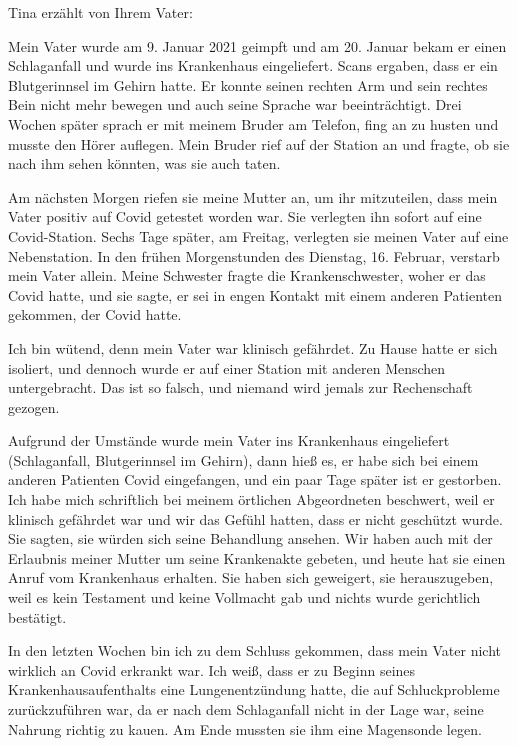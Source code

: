 Tina erzählt von Ihrem Vater:

Mein Vater wurde am 9. Januar 2021 geimpft und am 20. Januar bekam er einen
Schlaganfall und wurde ins Krankenhaus eingeliefert. Scans ergaben, dass er ein
Blutgerinnsel im Gehirn hatte. Er konnte seinen rechten Arm und sein rechtes
Bein nicht mehr bewegen und auch seine Sprache war beeinträchtigt. Drei Wochen
später sprach er mit meinem Bruder am Telefon, fing an zu husten und musste den
Hörer auflegen. Mein Bruder rief auf der Station an und fragte, ob sie nach ihm
sehen könnten, was sie auch taten.

Am nächsten Morgen riefen sie meine Mutter an, um ihr mitzuteilen, dass mein
Vater positiv auf Covid getestet worden war. Sie verlegten ihn sofort auf eine
Covid-Station. Sechs Tage später, am Freitag, verlegten sie meinen Vater auf
eine Nebenstation. In den frühen Morgenstunden des Dienstag, 16. Februar,
verstarb mein Vater allein. Meine Schwester fragte die Krankenschwester, woher
er das Covid hatte, und sie sagte, er sei in engen Kontakt mit einem anderen
Patienten gekommen, der Covid hatte.

Ich bin wütend, denn mein Vater war klinisch gefährdet. Zu Hause hatte er sich
isoliert, und dennoch wurde er auf einer Station mit anderen Menschen
untergebracht. Das ist so falsch, und niemand wird jemals zur Rechenschaft
gezogen.

Aufgrund der Umstände wurde mein Vater ins Krankenhaus eingeliefert
(Schlaganfall, Blutgerinnsel im Gehirn), dann hieß es, er habe sich bei einem
anderen Patienten Covid eingefangen, und ein paar Tage später ist er
gestorben. Ich habe mich schriftlich bei meinem örtlichen Abgeordneten
beschwert, weil er klinisch gefährdet war und wir das Gefühl hatten, dass er
nicht geschützt wurde. Sie sagten, sie würden sich seine Behandlung ansehen. Wir
haben auch mit der Erlaubnis meiner Mutter um seine Krankenakte gebeten, und
heute hat sie einen Anruf vom Krankenhaus erhalten. Sie haben sich geweigert,
sie herauszugeben, weil es kein Testament und keine Vollmacht gab und nichts
wurde gerichtlich bestätigt.

In den letzten Wochen bin ich zu dem Schluss gekommen, dass mein Vater nicht
wirklich an Covid erkrankt war. Ich weiß, dass er zu Beginn seines
Krankenhausaufenthalts eine Lungenentzündung hatte, die auf Schluckprobleme
zurückzuführen war, da er nach dem Schlaganfall nicht in der Lage war, seine
Nahrung richtig zu kauen. Am Ende mussten sie ihm eine Magensonde legen.
